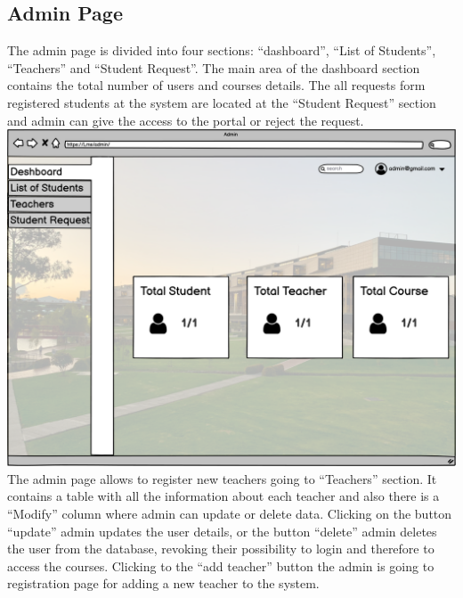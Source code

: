 \newpage
\subsection{Admin Page}
The admin page is divided into four sections: “dashboard”, “List of Students”, “Teachers” and “Student Request”. The main area of the dashboard section contains the total number of users and courses details. The all requests form registered students at the system  are located at the “Student Request” section and admin can give the access to the portal or reject the request.\\

\includegraphics[width=\columnwidth]{images/Admin Page.png}\\
\newpage
The admin page allows to register new teachers going to “Teachers” section. It contains a table  with all the information about each teacher and also there is a “Modify” column where admin can update or delete data.  Clicking on the button “update” admin updates the user details, or the button “delete” admin deletes the user from the database, revoking their possibility to login and therefore to access the courses. Clicking to the “add teacher” button the admin is going to registration page for adding a new teacher to the system.\\ 

